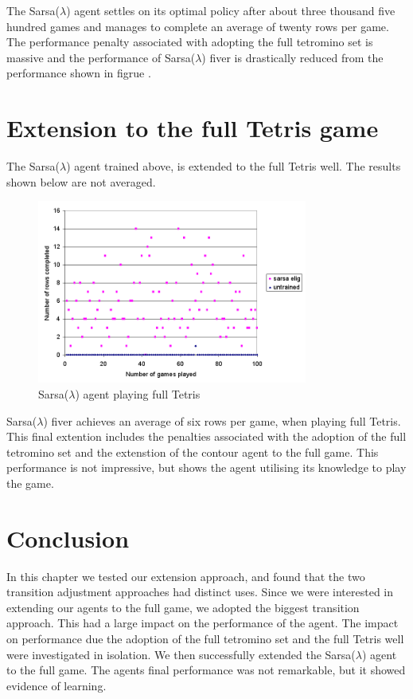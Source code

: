 \documentclass{rucsthesis}
\begin{document}
The Sarsa($\lambda$) agent settles on its optimal policy after about three thousand five hundred games and manages to complete an average of twenty rows per game. The performance penalty associated with adopting the full tetromino set is massive and the performance of Sarsa($\lambda$) fiver is drastically reduced from the performance shown in figrue \label{fig:sarsaeligredtet5well}.

\section{Extension to the full Tetris game}

The Sarsa($\lambda$) agent trained above, is extended to the full Tetris well. The results shown below are not averaged.

\begin{figure}[h]
\centering
\includegraphics[width=3.5in]{sarsaeligfulltetfullwell.png}
\caption{Sarsa($\lambda$) agent playing full Tetris}
\label{fig:sarsaeligtetris}
\end{figure}

Sarsa($\lambda$) fiver achieves an average of six rows per game, when playing full Tetris. This final extention includes the penalties associated with the adoption of the full tetromino set and the extenstion of the contour agent to the full game. This performance is not impressive, but shows the agent utilising its knowledge to play the game. 

\section{Conclusion}

In this chapter we tested our extension approach, and found that the two transition adjustment approaches had distinct uses. Since we were interested in extending our agents to the full game, we adopted the biggest transition approach. This had a large impact on the performance of the agent. The impact on performance due the adoption of the full tetromino set and the full Tetris well were investigated in isolation. We then successfully extended the Sarsa($\lambda$) agent to the full game. The agents final performance was not remarkable, but it showed evidence of learning.
\end{document}

